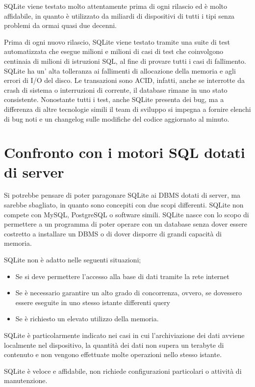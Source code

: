 SQLite viene testato molto attentamente prima di ogni rilascio ed è molto affidabile, in quanto è utilizzato da miliardi di dispositivi di tutti i tipi senza problemi da ormai quasi due decenni. 

Prima di ogni nuovo rilascio, SQLite viene testato tramite una suite di test automatizzata che esegue milioni e milioni di casi di test che coinvolgono centinaia di milioni di istruzioni SQL, al fine di provare tutti i casi di fallimento.
SQLite ha un’ alta tolleranza ai fallimenti di allocazione della memoria e agli errori di I/O del disco. Le transazioni sono ACID, infatti, anche se interrotte da crash di sistema o interruzioni di corrente, il database rimane in uno stato consistente.
Nonostante tutti i test, anche SQLite presenta dei bug, ma a differenza di altre tecnologie simili il team di sviluppo si impegna a fornire elenchi di bug noti e un changelog sulle modifiche del codice aggiornato al minuto.

\section{Confronto con i motori SQL dotati di server}
Si potrebbe pensare di poter paragonare SQLite ai DBMS \cite{dbms} dotati di server, ma sarebbe sbagliato, in quanto sono concepiti con due scopi differenti. SQLite non compete con MySQL, PostgreSQL o software simili. SQLite nasce con lo scopo di permettere a un programma di poter operare con un database senza dover essere costretto a installare un DBMS o di dover disporre di grandi capacità di memoria.

\medskip
SQLite non è adatto nelle seguenti situazioni;
\begin{itemize}

\item Se si deve permettere l'accesso alla base di dati tramite la rete internet
\item Se è necessario garantire un alto grado di concorrenza, ovvero, se dovessero essere eseguite in uno stesso istante differenti query
\item Se è richiesto un elevato utilizzo della memoria.
\end{itemize}

SQLite è particolarmente indicato nei casi in cui l'archiviazione dei dati avviene localmente nel dispositivo, la quantità dei dati non supera un terabyte di contenuto e non vengono effettuate molte operazioni nello stesso istante. 

SQLite è veloce e affidabile, non richiede configurazioni particolari o attività di manutenzione. 